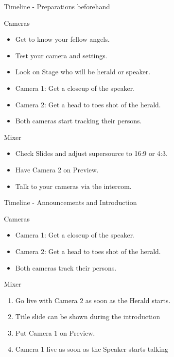 \documentclass[aspectratio=169]{beamer}
\begin{document}
\begin{frame}{Timeline - Preparations beforehand}
	\begin{block}{Cameras}
		\begin{itemize}
			\item Get to know your fellow angels.
			\item Test your camera and settings.
			\item Look on Stage who will be herald or speaker.
			\item Camera 1: Get a closeup of the speaker.
			\item Camera 2: Get a head to toes shot of the herald.
			\item Both cameras start tracking their persons.
		\end{itemize}
	\end{block}
	\begin{block}{Mixer}
		\begin{itemize}
			\item Check Slides and adjust supersource to 16:9 or 4:3.
			\item Have Camera 2 on Preview.
			\item Talk to your cameras via the intercom.
		\end{itemize}
	\end{block}
\end{frame}

\begin{frame}{Timeline - Announcements and Introduction}
	\begin{block}{Cameras}
		\begin{itemize}
			\item Camera 1: Get a closeup of the speaker.
			\item Camera 2: Get a head to toes shot of the herald.
			\item Both cameras track their persons.
		\end{itemize}
	\end{block}
	
	\begin{block}{Mixer}
		\begin{enumerate}
			\item Go live with Camera 2 as soon as the Herald starts.
			\item Title slide can be shown during the introduction 
			\item Put Camera 1 on Preview.
			\item Camera 1 live as soon as the Speaker starts talking
		\end{enumerate}
	\end{block}
\end{frame}
\end{document}
